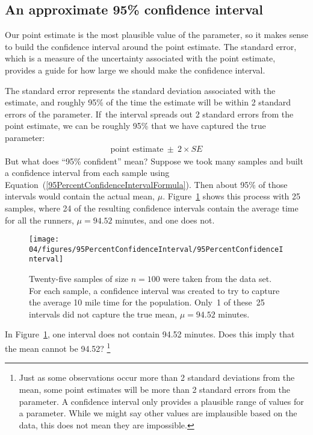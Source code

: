 \subsection{An approximate 95\% confidence interval}

Our point estimate is the most plausible value of the parameter, so it makes sense to build the confidence interval around the point estimate. The standard error, which is a measure of the uncertainty associated with the point estimate, provides a guide for how large we should make the confidence interval.

The standard error represents the standard deviation associated with the estimate, and roughly 95\% of the time the estimate will be within 2 standard errors of the parameter. If~the interval spreads out 2 standard errors from the point estimate, we can be roughly 95\%  that we have captured the true parameter:
\begin{eqnarray}
\text{point estimate}\ \pm\ 2\times SE
\label{95PercentConfidenceIntervalFormula}
\end{eqnarray}
But what does ``95\% confident'' mean? Suppose we took many samples and built a confidence interval from each sample using Equation~(\ref{95PercentConfidenceIntervalFormula}). Then about 95\% of those intervals would contain the actual mean, $\mu$. Figure~\ref{95PercentConfidenceInterval} shows this process with 25 samples, where 24 of the resulting confidence intervals contain the average time for all the runners, $\mu=94.52$ minutes, and one does not.

\begin{figure}[hht]
   \centering
   \texttt{[image: 04/figures/95PercentConfidenceInterval/95PercentConfidenceInterval]}
   \caption{Twenty-five samples of size $n=100$ were taken from the  data set. For each sample, a confidence interval was created to try to capture the average 10 mile time for the population. Only~1 of these~25 intervals did not capture the true mean, $\mu = 94.52$ minutes.}
   \label{95PercentConfidenceInterval}
\end{figure}

\begin{exercise}
In Figure~\ref{95PercentConfidenceInterval}, one interval does not contain 94.52 minutes. Does this imply that the mean cannot be 94.52? \footnote{Just as some observations occur more than 2 standard deviations from the mean, some point estimates will be more than 2 standard errors from the parameter. A confidence interval only provides a plausible range of values for a parameter. While we might say other values are implausible based on the data, this does not mean they are impossible.}
\end{exercise}

